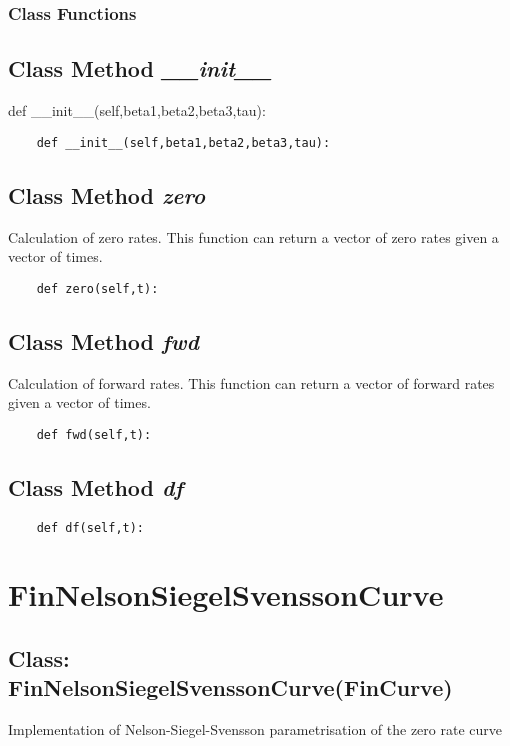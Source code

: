 \documentclass[twoside,11pt]{book}
\begin{document}
\subsubsection{Class Functions}

\subsection{Class Method {\it \_\_init\_\_}}
def \_\_init\_\_(self,beta1,beta2,beta3,tau):

\begin{lstlisting}
    def __init__(self,beta1,beta2,beta3,tau):
\end{lstlisting}

\subsection{Class Method {\it zero}}
Calculation of zero rates. This function can return a vector of zero rates given a vector of times. 

\begin{lstlisting}
    def zero(self,t):
\end{lstlisting}

\subsection{Class Method {\it fwd}}
Calculation of forward rates. This function can return a vector of forward rates given a vector of times. 

\begin{lstlisting}
    def fwd(self,t):
\end{lstlisting}

\subsection{Class Method {\it df}}


\begin{lstlisting}
    def df(self,t):
\end{lstlisting}

\newpage
\section{FinNelsonSiegelSvenssonCurve}

\subsection{Class: FinNelsonSiegelSvenssonCurve(FinCurve)}
Implementation of Nelson-Siegel-Svensson parametrisation of the zero rate curve 
\end{document}
